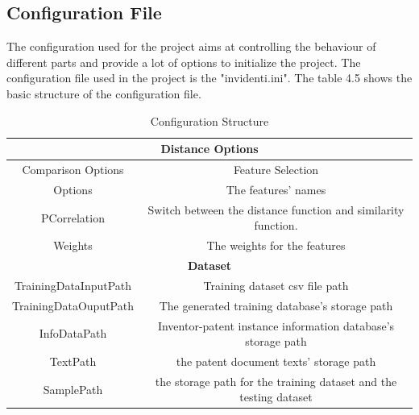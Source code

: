\subsection{Configuration File}
The configuration used for the project aims at controlling the behaviour of different parts and provide a lot of options to initialize the project. The configuration file used in the project is the "invidenti.ini". The table 4.5 shows the basic structure of the configuration file.
\begin{table}
\centering
\begin{tabular}{|c|c|}
\hline
\multicolumn{2}{|c|}{\textbf{Distance Options}} \\
\hline
Comparison Options & Feature Selection   \\
\hline
Options & The features' names \\
\hline
PCorrelation & Switch between the distance function and similarity function. \\
\hline
Weights & The weights for the features\\
\hline
\multicolumn{2}{|c|}{\textbf{Dataset}} \\
\hline
TrainingDataInputPath & Training dataset csv file path \\
\hline
TrainingDataOuputPath& The generated training database's storage path \\
\hline
InfoDataPath & Inventor-patent instance information database's storage path \\
\hline
TextPath & the patent document texts' storage path \\
\hline
SamplePath & the storage path for the training dataset and the testing dataset  \\
\hline
\end{tabular}
\caption{Configuration Structure}
\end{table}
